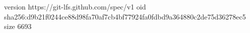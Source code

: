 version https://git-lfs.github.com/spec/v1
oid sha256:d9b21f0244ce88d98fa70af7cb4bf77924fa0fdbd9a364880c2de75d36278ec5
size 6693

